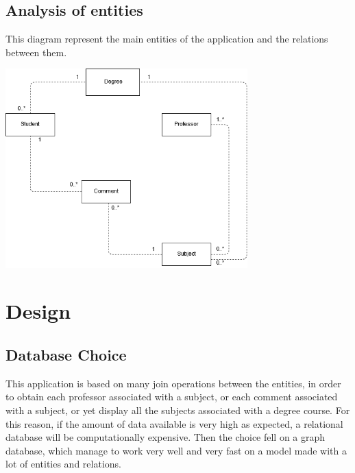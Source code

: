 \documentclass[a4paper]{article}
\begin{document}
\subsection{Analysis of entities}
This diagram represent the main entities of the application and the relations between them.
\begin{minipage}{\linewidth}
\begin{center}
\vspace{4mm}
\includegraphics[width = 0.7\textwidth]{./images/diagrams/AnalysisUML.png} 
\vspace{2mm}
\label{fig:analisys_diagram}
\end{center}
\end{minipage}

\clearpage
\section{Design}

\subsection{Database Choice}
This application is based on many join operations between the entities, in order to obtain each professor associated with a subject, or each comment associated with a subject, or yet display all the subjects associated with a degree course. For this reason, if the amount of data available is very high as expected, a relational database will be computationally expensive. Then the choice fell on a graph database, which manage to work very well and very fast on a model made with a lot of entities and relations.\\
\end{document}
